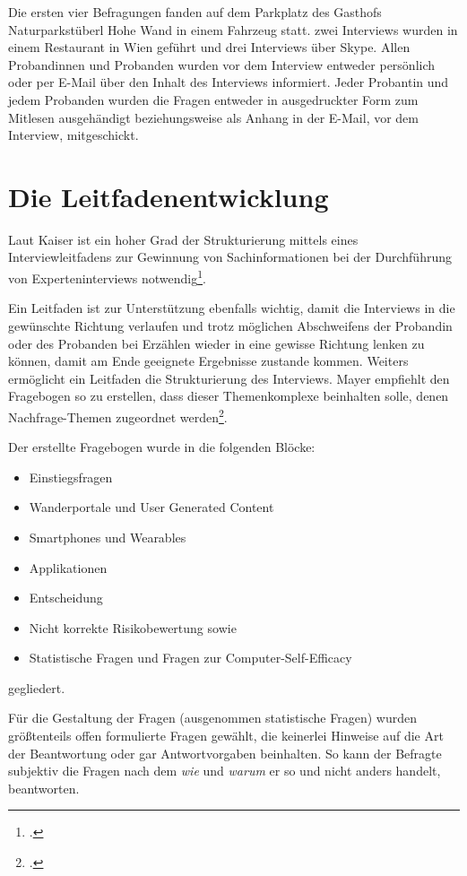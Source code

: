 Die ersten vier Befragungen fanden auf dem Parkplatz des Gasthofs Naturparkstüberl Hohe Wand in einem Fahrzeug statt. 
zwei Interviews wurden in einem Restaurant in Wien geführt und drei Interviews über Skype. Allen Probandinnen und Probanden wurden vor dem Interview entweder persönlich oder per E-Mail über den Inhalt des Interviews informiert. Jeder Probantin und jedem Probanden wurden die Fragen entweder in ausgedruckter Form zum Mitlesen ausgehändigt beziehungsweise als Anhang in der E-Mail, vor dem Interview, mitgeschickt.

\section{Die Leitfadenentwicklung}

Laut Kaiser ist ein hoher Grad der Strukturierung mittels eines Interviewleitfadens zur Gewinnung von Sachinformationen bei der Durchführung von Experteninterviews notwendig\footcite[S. 3]{kaiser}.

Ein Leitfaden ist zur Unterstützung ebenfalls wichtig, damit die Interviews in die gewünschte Richtung verlaufen und trotz möglichen Abschweifens der Probandin oder des Probanden bei Erzählen wieder in eine gewisse Richtung lenken zu können, damit am Ende geeignete Ergebnisse zustande kommen. Weiters ermöglicht ein Leitfaden die Strukturierung des Interviews. Mayer empfiehlt den Fragebogen so zu erstellen, dass dieser Themenkomplexe beinhalten solle, denen Nachfrage-Themen zugeordnet werden\footcite[S. 45]{mayer}. 

Der erstellte Fragebogen wurde in die folgenden Blöcke:
\begin{itemize}
	\item Einstiegsfragen
	\item Wanderportale und User Generated Content
	\item Smartphones und Wearables
	\item Applikationen
	\item Entscheidung
	\item Nicht korrekte Risikobewertung sowie
	\item Statistische Fragen und Fragen zur Computer-Self-Efficacy	
\end{itemize}
gegliedert.

Für die Gestaltung der Fragen (ausgenommen statistische Fragen) wurden größtenteils offen formulierte Fragen gewählt, die keinerlei Hinweise auf die Art der Beantwortung oder gar Antwortvorgaben beinhalten. So kann der Befragte subjektiv die Fragen nach dem \textit{wie} und \textit{warum} er so und nicht anders handelt, beantworten. 


